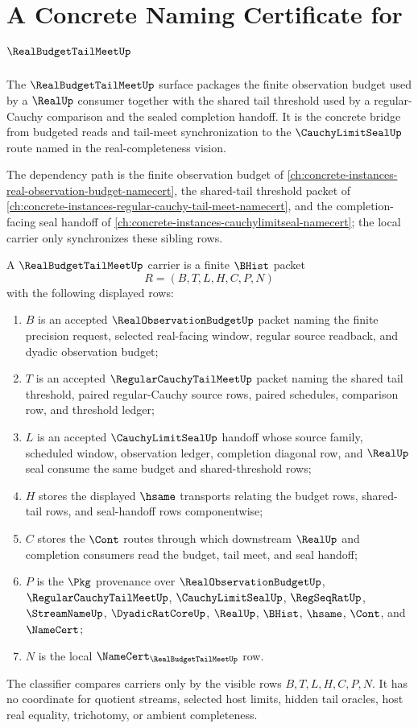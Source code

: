 \chapter{A Concrete Naming Certificate for $\RealBudgetTailMeetUp$}
\label{ch:concrete-instances-real-budget-tail-meet-namecert}

The $\RealBudgetTailMeetUp$ surface packages the finite observation budget used by a $\RealUp$ consumer together with the shared tail threshold used by a regular-Cauchy comparison and the sealed completion handoff. It is the concrete bridge from budgeted reads and tail-meet synchronization to the $\CauchyLimitSealUp$ route named in the real-completeness vision.

The dependency path is the finite observation budget of \autoref{ch:concrete-instances-real-observation-budget-namecert}, the shared-tail threshold packet of \autoref{ch:concrete-instances-regular-cauchy-tail-meet-namecert}, and the completion-facing seal handoff of \autoref{ch:concrete-instances-cauchylimitseal-namecert}; the local carrier only synchronizes these sibling rows.

\begin{definition}
\label{def:real-budget-tail-meet-carrier}
A $\RealBudgetTailMeetUp$ carrier is a finite $\BHist$ packet
$$
R=(B,T,L,H,C,P,N)
$$
with the following displayed rows:
\begin{enumerate}
\item $B$ is an accepted $\RealObservationBudgetUp$ packet naming the finite precision request, selected real-facing window, regular source readback, and dyadic observation budget;
\item $T$ is an accepted $\RegularCauchyTailMeetUp$ packet naming the shared tail threshold, paired regular-Cauchy source rows, paired schedules, comparison row, and threshold ledger;
\item $L$ is an accepted $\CauchyLimitSealUp$ handoff whose source family, scheduled window, observation ledger, completion diagonal row, and $\RealUp$ seal consume the same budget and shared-threshold rows;
\item $H$ stores the displayed $\hsame$ transports relating the budget rows, shared-tail rows, and seal-handoff rows componentwise;
\item $C$ stores the $\Cont$ routes through which downstream $\RealUp$ and completion consumers read the budget, tail meet, and seal handoff;
\item $P$ is the $\Pkg$ provenance over $\RealObservationBudgetUp$, $\RegularCauchyTailMeetUp$, $\CauchyLimitSealUp$, $\RegSeqRatUp$, $\StreamNameUp$, $\DyadicRatCoreUp$, $\RealUp$, $\BHist$, $\hsame$, $\Cont$, and $\NameCert$;
\item $N$ is the local $\NameCert_{\RealBudgetTailMeetUp}$ row.
\end{enumerate}
The classifier compares carriers only by the visible rows $B,T,L,H,C,P,N$. It has no coordinate for quotient streams, selected host limits, hidden tail oracles, host real equality, trichotomy, or ambient completeness.
\end{definition}

